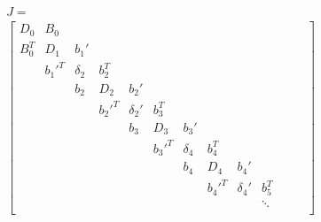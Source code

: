 \documentclass[]{article}
\newcommand{\BIN}{\begin{bmatrix}}
\newcommand{\BOUT}{\end{bmatrix}}
\begin{document}
\begin{align*}
  &J =\\ &\BIN
    D_0   & B_0    &          &        &           &        &          &        &           &             &                &            &           \\
    B_0^T & D_1    & b_1'     &        &           &        &          &        &           &             &                &            &           \\
          & b_1'^T & \delta_2 & b_2^T  &           &        &          &        &           &             &                &            &           \\
          &        & b_2      & D_2    & b_2'      &        &          &        &           &             &                &            &           \\
          &        &          & b_2'^T & \delta_2' & b_3^T  &          &        &           &             &                &            &           \\
          &        &          &        & b_3       & D_3    & b_3'     &        &           &             &                &            &           \\
          &        &          &        &           & b_3'^T & \delta_4 & b_4^T  &           &             &                &            &           \\
          &        &          &        &           &        & b_4      & D_4    & b_4'      &             &                &            &           \\
          &        &          &        &           &        &          & b_4'^T & \delta_4' & b_5^T       &                &            &           \\
          &        &          &        &           &        &          &        &           & \ddots      &                &            &           \\ 
  \BOUT
\end{align*}
\end{document}
